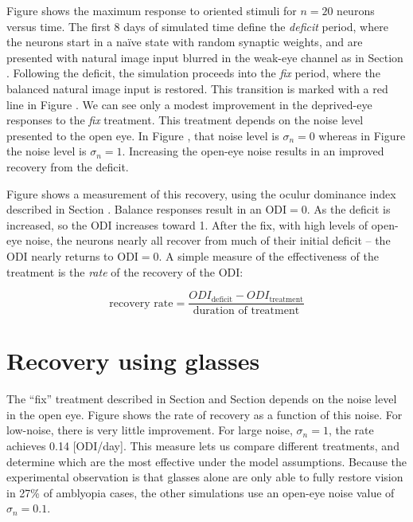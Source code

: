 \documentclass[
  letterpaper,
  number]{elsarticle}
\begin{document}
Figure \citep{fig:y_vs_t_fix_n0} shows the maximum response to oriented
stimuli for \(n=20\) neurons versus time. The first 8 days of simulated
time define the \emph{deficit} period, where the neurons start in a
naïve state with random synaptic weights, and are presented with natural
image input blurred in the weak-eye channel as in Section
\citep{sec:methods}. Following the deficit, the simulation proceeds into
the \emph{fix} period, where the balanced natural image input is
restored. This transition is marked with a red line in Figure
\citep{fig:y_vs_t_fix_n0}. We can see only a modest improvement in the
deprived-eye responses to the \emph{fix} treatment. This treatment
depends on the noise level presented to the open eye. In Figure
\citep{fig:y_vs_t_fix_n0}, that noise level is \(\sigma_n = 0\) whereas
in Figure \citep{fig:y_vs_t_fix_n1} the noise level is \(\sigma_n=1\).
Increasing the open-eye noise results in an improved recovery from the
deficit.

Figure \citep{fig:ODI_vs_t_fix_n1} shows a measurement of this recovery,
using the oculur dominance index described in Section
\citep{sec:ocular-dominance-index}. Balance responses result in an
\(\text{ODI}=0\). As the deficit is increased, so the ODI increases
toward 1. After the fix, with high levels of open-eye noise, the neurons
nearly all recover from much of their initial deficit -- the ODI nearly
returns to \(\text{ODI}=0\). A simple measure of the effectiveness of
the treatment is the \emph{rate} of the recovery of the ODI:

\[
\text{recovery rate}=\frac{ODI_{\text{deficit}}-ODI_{\text{treatment}}}{\text{duration of treatment}}
\]

\hypertarget{recovery-using-glasses}{%
\section*{Recovery using glasses}\label{recovery-using-glasses}}

The ``fix'' treatment described in Section
\citep{sec:models-of-development-and-treatment-of-amblyopia} and Section
\citep{sec:deficit-and-measuring-the-effectiveness-of-a-treatment}
depends on the noise level in the open eye. Figure
\citep{fig:dODI_fix_vs_noise} shows the rate of recovery as a function
of this noise. For low-noise, there is very little improvement. For
large noise, \(\sigma_n=1\), the rate achieves 0.14 {[}ODI/day{]}. This
measure lets us compare different treatments, and determine which are
the most effective under the model assumptions. Because the experimental
observation is that glasses alone are only able to fully restore vision
in 27\% of amblyopia cases\citep{wallace2006treatment}, the other
simulations use an open-eye noise value of \(\sigma_n=0.1\).
\end{document}
